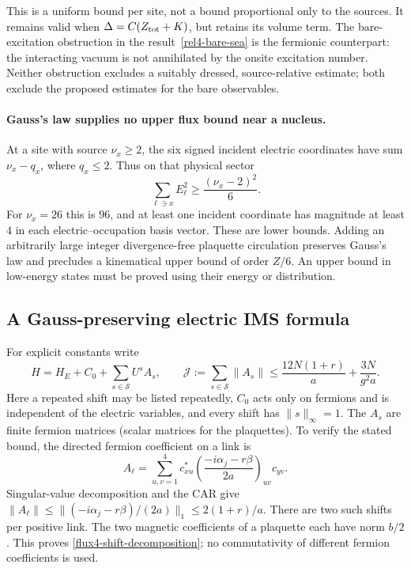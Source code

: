This is a uniform bound per site, not a bound proportional only to
the sources.  It remains valid when $\Delta=C(Z_{\rm tot}+K)$, but
retains its volume term.  The bare-excitation obstruction in
the result~\ref{rel4-bare-sea} is the fermionic counterpart: the
interacting vacuum is not annihilated by the onsite excitation number.
Neither obstruction excludes a suitably dressed, source-relative
estimate; both exclude the proposed estimates for the bare observables.

\paragraph{Gauss's law supplies no upper flux bound near a nucleus.}
At a site with source $\nu_x\ge2$, the six signed incident electric
coordinates have sum $\nu_x-q_x$, where $q_x\le2$.  Thus on that
physical sector
\begin{equation}
 \sum_{\ell\ni x}E_\ell^2\ge\frac{(\nu_x-2)^2}{6}.
 \label{flux4-local-gauss-lower}
\end{equation}
For $\nu_x=26$ this is $96$, and at least one incident coordinate
has magnitude at least $4$ in each electric--occupation basis vector.
These are lower bounds.  Adding an arbitrarily large integer
divergence-free plaquette circulation preserves Gauss's law and
precludes a kinematical upper bound of order $Z/6$.  An upper bound
in low-energy states must be proved using their energy or distribution.

\subsection{A Gauss-preserving electric IMS formula}

For explicit constants write
\begin{equation}
 H=H_E+C_0+\sum_{s\in\mathcal S}U^s A_s,
 \qquad
 \mathcal J:=\sum_{s\in\mathcal S}\|A_s\|
 \le\frac{12N(1+r)}a+\frac{3N}{g^2a}.
 \label{flux4-shift-decomposition}
\end{equation}
Here a repeated shift may be listed repeatedly, $C_0$ acts only on
fermions and is independent of the electric variables, and every
shift has $\|s\|_\infty=1$.  The $A_s$ are finite fermion matrices
(scalar matrices for the plaquettes).  To verify the stated bound,
the directed fermion coefficient on a link is
\[
 A_\ell=\sum_{u,v=1}^4c_{xu}^*
       \left(\frac{-i\alpha_j-r\beta}{2a}\right)_{uv}c_{yv}.
\]
Singular-value decomposition and the CAR give
$\|A_\ell\|\le\|(-i\alpha_j-r\beta)/(2a)\|_1
\le2(1+r)/a$.  There are two such shifts per positive link.
The two magnetic coefficients of a plaquette each have norm $b/2$.
This proves \eqref{flux4-shift-decomposition}; no commutativity of
different fermion coefficients is used.

